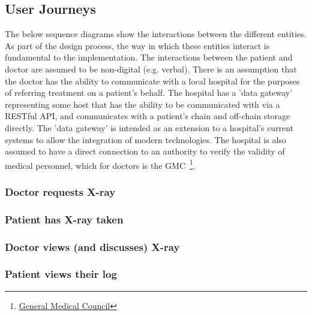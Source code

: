 \subsection{User Journeys}

The below sequence diagrams show the interactions between the different entities. As part of the design process, the way in which these entities interact is fundamental to the implementation. The interactions between the patient and doctor are assumed to be non-digital (e.g. verbal). There is an assumption that the doctor has the ability to communicate with a local hospital for the purposes of referring treatment on a patient's behalf. The hospital has a 'data gateway' representing some host that has the ability to be communicated with via a RESTful API, and communicates with a patient's chain and off-chain storage directly. The 'data gateway' is intended as an extension to a hospital's current systems to allow the integration of modern technologies. The hospital is also assumed to have a direct connection to an authority to verify the validity of medical personnel, which for doctors is the GMC~\footnote{\href{http://www.gmc-uk.org/}{General Medical Council}}.

\subsubsection{Doctor requests X-ray}



\subsubsection{Patient has X-ray taken}



\subsubsection{Doctor views (and discusses) X-ray}



\subsubsection{Patient views their log}




